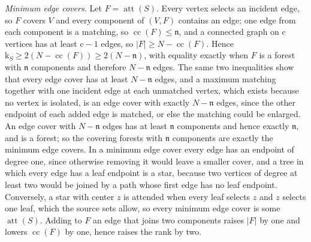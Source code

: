 \emph{Minimum edge covers.} Let \(F=\operatorname{att}(S)\). Every vertex
selects an incident edge, so \(F\) covers \(V\) and every component of
\((V,F)\) contains an edge; one edge from each component is a matching, so
\(\operatorname{cc}(F)\le\mathfrak n\), and a connected graph on
\(\mathrm c\) vertices has at least \(\mathrm c-1\) edges, so
\(|F|\ge N-\operatorname{cc}(F)\). Hence
\(\mathrm k_S\ge2(N-\operatorname{cc}(F))\ge2(N-\mathfrak n)\), with
equality exactly when \(F\) is a forest with \(\mathfrak n\) components and
therefore \(N-\mathfrak n\) edges. The same two inequalities show that every
edge cover has at least \(N-\mathfrak n\) edges, and a maximum matching
together with one incident edge at each unmatched vertex, which exists
because no vertex is isolated, is an edge cover with exactly
\(N-\mathfrak n\) edges, since the other endpoint of each added edge is
matched, or else the matching could be enlarged. An edge cover with
\(N-\mathfrak n\) edges has at least \(\mathfrak n\) components and hence
exactly \(\mathfrak n\), and is a forest; so the covering forests with
\(\mathfrak n\) components are exactly the minimum edge covers. In a
minimum edge cover every edge has an endpoint of degree one, since otherwise
removing it would leave a smaller cover, and a tree in which every edge has
a leaf endpoint is a star, because two vertices of degree at least two would
be joined by a path whose first edge has no leaf endpoint. Conversely, a
star with center \(z\) is attended when every leaf selects \(z\) and \(z\)
selects one leaf, which the source sets allow, so every minimum edge cover
is some \(\operatorname{att}(S)\). Adding to \(F\) an edge that joins two
components raises \(|F|\) by one and lowers \(\operatorname{cc}(F)\) by one,
hence raises the rank by two.

